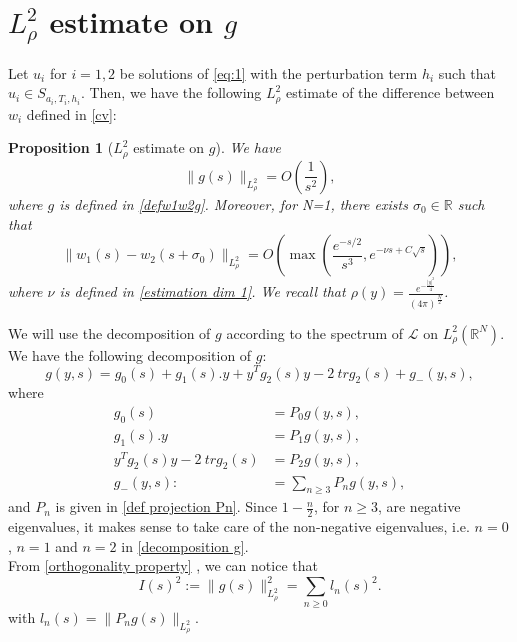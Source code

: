 \documentclass[11pt,a4paper]{article}
\newcommand{\1}{\mathbbm{1}}
\numberwithin{equation}{section}
\newcommand{\numberset}{\mathbb}
\newcommand{\R}{\numberset{R}}
\newtheorem{prp}[lemma]{Proposition}
\theoremstyle{remark}
\begin{document}
\section{$L^2_\rho$ estimate on $g$}\label{L 2 estimate}
Let $u_i$ for $i=1,2$ be solutions of \eqref{eq:1} with the perturbation term $h_i$ such that $u_i\in S_{a_i,T_i,h_i}$. Then, we have the following $L^2_\rho$ estimate of the difference between $w_i$ defined in \eqref{cv}:
\begin{prp}[$L^2_\rho$ estimate on $g$]\label{prp:g in L^2_rho}
We have
\begin{equation}\label{estimation L^2_rho}
\|g(s)\|_{L^2_\rho}=O\left(\frac{1}{s^2}\right),
\end{equation}
where $g$ is defined in \eqref{defw1w2g}. Moreover, for N=1, there exists $\sigma_0\in \R$ such that
\begin{equation}\label{estimation L^2_rho N=1}
\|w_1(s)-w_2(s+\sigma_0)\|_{L^2_\rho}= O\left( \max (\frac{e^{-s/2}}{s^3}, e^{-\nu s+C \sqrt{s}})\right),
\end{equation}
where $\nu$ is defined in \eqref{estimation dim 1}. We recall that $\rho(y)= \frac{e^{-\frac{|y|^2}{4}}}{(4\pi)^{\frac{N}{2}}}$.
\end{prp}




We will use the decomposition of $g$ according to the spectrum of $\mathcal{L}$ on $L^2_\rho(\R^N)$.  We have the following decomposition of $g$:
\begin{equation}\label{decomposition g}
g(y,s)=g_0(s)+g_1(s).y+ y^T g_2(s)y-2\ tr g_2(s)+ g_-(y,s),
\end{equation}
where 
\begin{equation*}
\begin{aligned}
g_0(s)&=P_0g(y,s),\\
g_1(s).y&=P_1g(y,s),\\
y^T g_2(s)y-2\ tr g_2(s)&=P_2g(y,s),\\
g_-(y,s):&=\underset{n\geq 3}{\sum}P_n g(y,s),
\end{aligned}
\end{equation*}
and $P_n$ is given in \eqref{def projection Pn}. Since $1-\frac{n}{2}$, for $n\geq 3$, are negative eigenvalues, it makes sense to take care of the non-negative eigenvalues, i.e. $n=0$, $n=1$ and $n=2$ in \eqref{decomposition g}.\\
From \eqref{orthogonality property} , we can notice that 
\begin{equation}\label{decomposition}
I(s)^2:=\|g(s)\|_{L^2_\rho}^2=\underset{n\geq 0}{\sum}l_n(s)^2.
\end{equation}
with $l_n(s)=\|P_n g(s)\|_{L^2_\rho}.$ 
\end{document}
